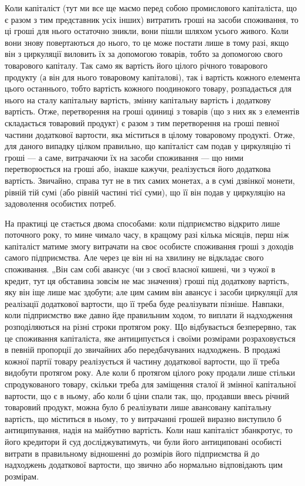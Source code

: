Коли капіталіст (тут ми все ще маємо перед собою промислового капіталіста,
що є разом з тим представник усіх інших) витратить гроші на
засоби споживання, то ці гроші для нього остаточно зникли, вони пішли
шляхом усього живого. Коли вони знову повертаються до нього, то це
може постати лише в тому разі, якщо він з циркуляції виловить їх за допомогою
товарів, тобто за допомогою свого товарового капіталу. Так само
як вартість його цілого річного товарового продукту (а він для нього \deq{} товаровому
капіталові), так і вартість кожного елемента цього останнього, тобто
вартість кожного поодинокого товару, розпадається для нього на сталу капітальну
вартість, змінну капітальну вартість і додаткову вартість. Отже,
перетворення на гроші одиниці з товарів (що з них як з елементів складається
товаровий продукт) є разом з тим перетворення на гроші певної частини
додаткової вартости, яка міститься в цілому товаровому продукті. Отже,
для даного випадку цілком правильно, що капіталіст сам подав у циркуляцію
ті гроші — а саме, витрачаючи їх на засоби споживання — що
ними перетворюється на гроші або, інакше кажучи, реалізується його
додаткова вартість. Звичайно, справа тут не в тих самих монетах, а
в сумі дзвінкої монети, рівній тій сумі (або рівній частині тієї суми),
що її він подав у циркуляцію на задоволення особистих потреб.

На практиці це стається двома способами: коли підприємство відкрито
лише поточного року, то мине чимало часу, в кращому разі кілька місяців,
перш ніж капіталіст матиме змогу витрачати на своє особисте споживання
гроші з доходів самого підприємства. Але через це він ні на хвилину
не відкладає свого споживання. „Він сам собі авансує (чи з своєї
власної кишені, чи з чужої в кредит, тут ця обставина зовсім не має
значення) гроші під додаткову вартість, яку він іще лише має здобути;
але цим самим він авансує і засоби циркуляції для реалізації додаткової
вартости, що її треба буде реалізувати пізніше. Навпаки, коли підприємство
вже давно йде правильним ходом, то виплати й надходження розподіляються
на різні строки протягом року. Що відбувається безперервно,
так це споживання капіталіста, яке антиципується і своїми розмірами
розраховується в певній пропорції до звичайних або передбачуваних надходжень.
В продажі кожної партії товару реалізується й частину додаткової
вартости, що її треба видобути протягом року. Але коли б протягом
цілого року продали лише стільки спродукованого товару, скільки
треба для заміщення сталої й змінної капітальної вартости, що є в ньому,
або коли б ціни спали так, що, продавши ввесь річний товаровий продукт,
можна було б реалізувати лише авансовану капітальну вартість, що
міститься в ньому, то у витрачанні грошей виразно виступило б антиципування,
надія на майбутню вартість. Коли наш капіталіст збанкротує,
то його кредитори й суд досліджуватимуть, чи були його антициповані
особисті витрати в правильному відношенні до розмірів його підприємства
й до надходжень додаткової вартости, що звично або нормально відповідають
цим розмірам.

